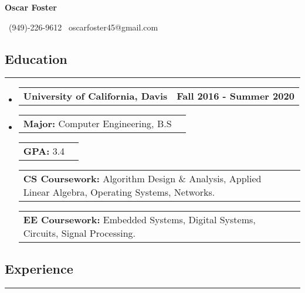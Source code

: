 \documentclass[10pt,letterpaper]{article}
\makeatletter
\newcommand{\items}[2]
{
	\begin{tabular*}{\linewidth}{l @{\extracolsep{\fill}} r}
		#1 & #2 \\
	\end{tabular*}
}
\newcommand{\header}[2]
{
	\begin{tabular*}{\linewidth}{l @{\extracolsep{\fill}} r}
		\hspace{-27pt} #1 & #2 \\
	\end{tabular*}
}
\newcommand{\sectionbreak}
{
	\vspace{-1.2em}
	\rule{\textwidth}{1.7pt}
	\vspace{-1.7em}
}
\makeatother
\begin{document}
\begin{center}
{\LARGE \textbf{Oscar Foster}}

\vspace{0.5em}
\ (949)-226-9612 \textbar 
\ oscarfoster45@gmail.com \textbar
\ \href{https://github.com/AashPointO}{\emph{\underline{}}}
\\
\end{center}
\vspace{-20pt}


\subsection*{Education}
\sectionbreak

\begin{itemize}

\item[] 
	\header
		{\textbf{University of California, Davis}}
		{\textbf{Fall 2016 - Summer 2020}}
\item[]
	\vspace{-2.5pt}
	\items
		{\textbf{Major:} Computer Engineering, B.S}
		{}
	\items
		{\textbf{GPA:} 3.4}
		{}
	\items
		{\textbf{CS Coursework:} Algorithm Design \& Analysis, Applied Linear Algebra, Operating Systems, Networks.}
		{}
	\items
		{\textbf{EE Coursework:} Embedded Systems, Digital Systems, Circuits, Signal Processing.}
		{}
{\vspace{-0.6em}}
	
\end{itemize}

\vspace{-24.65pt}

\subsection*{Experience}
\sectionbreak
\end{document}
